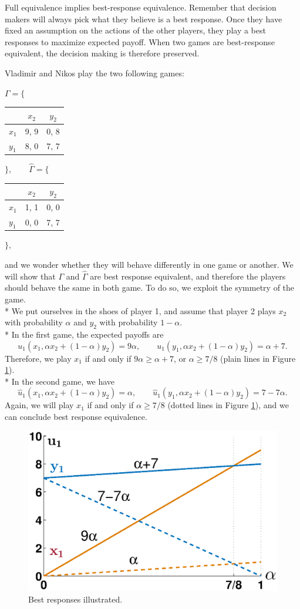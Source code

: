 Full equivalence implies best-response equivalence. 
Remember that decision makers will always pick what they believe is a best response. Once they have fixed an assumption on the actions of the other players, they play a best responses to maximize expected payoff.
When two games are best-response equivalent, the decision making is therefore preserved.


\begin{example}
Vladimir and Nikos play the two following games:

\begin{center}
$\Gamma = \Bigg \{ $
\begin{tabular}{l|cc}
 & $x_2$ & $y_2$  \\
\hline
$x_1$ & 9, 9 & 0, 8 \\
$y_1$ & 8, 0 & 7, 7 
\end{tabular} $\Bigg \}, \qquad \hat{\Gamma} =  \Bigg \{  $
\begin{tabular}{l|cc}
  & $x_2$ & $y_2$  \\
\hline
$x_1$ & 1, 1 & 0, 0 \\
$y_1$ & 0, 0 & 7, 7 
\end{tabular}
$\Bigg \},$
\end{center}
and we wonder whether they will behave differently in one game or another. We will show that $\Gamma$ and $\hat \Gamma$ are best response equivalent, and therefore the players should behave the same in both game. To do so, we exploit the symmetry of the game.\\*
We put ourselves in the shoes of player 1, and assume that player 2 plays $x_2$ with probability $\alpha$ and $y_2$ with probability $1-\alpha$.\\*
In the first game, the expected payoffs are 
$$u_1(x_1, \alpha x_2 + (1-\alpha) y_2) = 9 \alpha, \qquad u_1(y_1, \alpha x_2 + (1-\alpha) y_2) =  \alpha + 7. $$
Therefore, we play $x_1$ if and only if $9\alpha \geq \alpha + 7$, or $\alpha \geq 7/8$ (plain lines in Figure \ref{chap2:breq}).\\*
In the second game, we have
$$\hat{u}_1(x_1, \alpha x_2 + (1-\alpha) y_2) =  \alpha, \qquad \hat{u}_1(y_1, \alpha x_2 + (1-\alpha) y_2) =   7 - 7\alpha. $$
Again, we will play $x_1$ if and only if $\alpha \geq 7/8$ (dotted lines in Figure \ref{chap2:breq}), 
and we can conclude best response equivalence. 
\begin{figure}[!ht]
\centering
\includegraphics[width=0.75 \textwidth]{breq.eps}
\caption{Best responses illustrated.}
\label{chap2:breq}
\end{figure}
\end{example}


